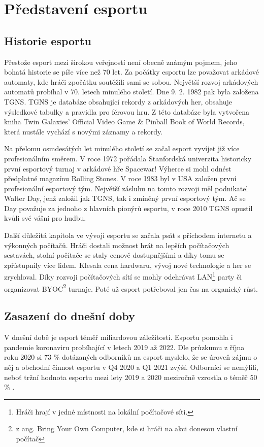 \chapter{Představení esportu}
\section{Historie esportu}
Přestože esport mezi širokou veřejností není obecně známým pojmem, jeho bohatá historie se píše více než 70 let. Za počátky esportu lze považovat arkádové automaty, kde hráči
zpočátku soutěžili sami se sobou. Největší rozvoj arkádových automatů probíhal v 70. letech minulého století. Dne 9. 2. 1982 pak byla založena \ac{TGNS}. \ac{TGNS} je databáze
obsahující rekordy z arkádových her, obsahuje výsledkové tabulky a pravidla pro férovou hru. Z této databáze byla vytvořena kniha Twin Galaxies' Official
Video Game \& Pinball Book of World Records, která nustále vychází s novými záznamy a rekordy.

Na přelomu osmdesátých let minulého století se začal esport vyvíjet již více profesionálním směrem. V roce 1972 pořádala Stanfordská univerzita historicky první
esportový turnaj v arkádové hře Spacewar! Výherce si mohl odnést předplatné magazínu Rolling Stones. V roce 1983 byl v USA založen první profesionální esportový tým. Největší
zásluhu na tomto rozvoji měl podnikatel Walter Day, jenž založil jak \ac{TGNS}, tak i zmíněný první esportový tým. Ač se Day považuje za jednoho z hlavních pionýrů esportu, v
roce 2010 \ac{TGNS} opustil kvůli své vášni pro hudbu.

Další důležitá kapitola ve vývoji esportu se začala psát s příchodem internetu a výkonných počítačů. Hráči dostali možnost hrát na lepších počítačových sestavách, stolní počítače
se staly cenově dostupnějšími a díky tomu se zpřístupnily více lidem. Klesala cena hardwaru, vývoj nové technologie a her se zrychloval. Díky rozvoji počítačových sítí se mohly
odehrávat LAN\footnote{Hráči hrají v jedné místnosti na lokální počítačové síti.} party či organizovat BYOC\footnote{z ang. Bring Your Own Computer, kde si hráči na akci donesou
vlastní počítač} turnaje. Poté už esport potřeboval jen čas na organický růst.

\section{Zasazení do dnešní doby}
V dnešní době je esport téměř miliardovou záležitostí. Esportu pomohla i pandemie koronaviru probíhající v letech 2019 až 2022.
Dle průzkumu \cite{gough_future_2021} z října roku 2020 si 73 \% dotázaných odborníků na esport myslelo, že se úroveň zájmu o něj a obchodní činnost esportu v Q4 2020 a
Q1 2021 zvýší. Odborníci se nemýlili, neboť tržní hodnota esportu mezi lety 2019 a 2020 meziročně vzrostla o téměř 50 \% \cite{gough_global_2022}.

